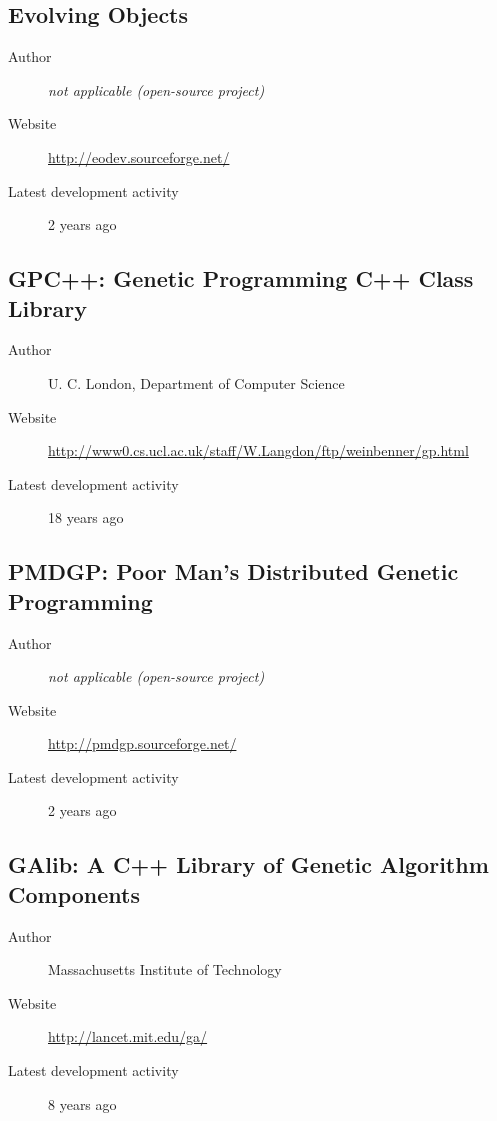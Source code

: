 \subsection*{Evolving Objects}
\begin{description}
    \item[Author] \textit{not applicable (open-source project)}
    \item[Website] \url{http://eodev.sourceforge.net/}
    \item[Latest development activity] 2 years ago
\end{description}


\subsection*{GPC++: Genetic Programming C++ Class Library}
\begin{description}
    \item[Author] U. C. London, Department of Computer Science
    \item[Website] \url{http://www0.cs.ucl.ac.uk/staff/W.Langdon/ftp/weinbenner/gp.html}
    \item[Latest development activity] 18 years ago
\end{description}


\subsection*{PMDGP: Poor Man’s Distributed Genetic Programming}
\begin{description}
    \item[Author] \textit{not applicable (open-source project)}
    \item[Website] \url{http://pmdgp.sourceforge.net/}
    \item[Latest development activity] 2 years ago
\end{description}


\subsection*{GAlib: A C++ Library of Genetic Algorithm Components}
\begin{description}
    \item[Author] Massachusetts Institute of Technology
    \item[Website] \url{http://lancet.mit.edu/ga/}
    \item[Latest development activity] 8 years ago
\end{description}


